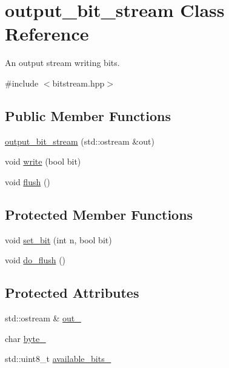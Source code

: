 \hypertarget{classoutput__bit__stream}{}\section{output\+\_\+bit\+\_\+stream Class Reference}
\label{classoutput__bit__stream}


An output stream writing bits.  




{\ttfamily \#include $<$bitstream.\+hpp$>$}

\subsection*{Public Member Functions}
\begin{DoxyCompactItemize}
\item 
\mbox{\hyperlink{classoutput__bit__stream_a5d493954dacb0de700a55d35d094b153}{output\+\_\+bit\+\_\+stream}} (std\+::ostream \&out)
\item 
void \mbox{\hyperlink{classoutput__bit__stream_a15313fe6a8c5d1d4782edeb076e411ae}{write}} (bool bit)
\item 
void \mbox{\hyperlink{classoutput__bit__stream_a91c4d0e8d471c0509e240daf5d7e7de5}{flush}} ()
\end{DoxyCompactItemize}
\subsection*{Protected Member Functions}
\begin{DoxyCompactItemize}
\item 
void \mbox{\hyperlink{classoutput__bit__stream_a486d69477b347169d02727d91b46afa4}{set\+\_\+bit}} (int n, bool bit)
\item 
void \mbox{\hyperlink{classoutput__bit__stream_a588daa77b98d61eaec7a5a34ee4005b3}{do\+\_\+flush}} ()
\end{DoxyCompactItemize}
\subsection*{Protected Attributes}
\begin{DoxyCompactItemize}
\item 
std\+::ostream \& \mbox{\hyperlink{classoutput__bit__stream_ac5fa747c95e4413b9fb790b300ee3b99}{out\+\_\+}}
\item 
char \mbox{\hyperlink{classoutput__bit__stream_ae8ecd2c6ae243278b2c15f7220582fa7}{byte\+\_\+}}
\item 
std\+::uint8\+\_\+t \mbox{\hyperlink{classoutput__bit__stream_a98b5bd8892725968c381cc992f4f23de}{available\+\_\+bits\+\_\+}}
\end{DoxyCompactItemize}


